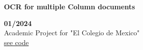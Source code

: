 \begin{minipage}{0.8\textwidth}
    \parbox{0.8\linewidth}{\textbf{OCR for multiple Column documents}}  \hfill  \textbf{01/2024}\\
    Academic Project for "El Colegio de Mexico"\\
    \href{https://github.com/JavierOramas/multi_column_ocr}{see code}\\
    \end{minipage} \hfill {}\\\\
